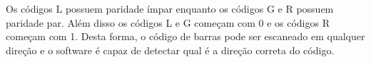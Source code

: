 \documentclass[portuguese,aspectratio=169]{beamer}
\begin{document}
\begin{frame}
Os códigos L possuem paridade ímpar enquanto os códigos G e R possuem paridade par.
Além disso os códigos L e G começam com 0 e os códigos R começam com 1.
Desta forma, o código de barras pode ser escaneado em qualquer direção e o software
é capaz de detectar qual é a direção correta do código.


\end{frame}
\end{document}
